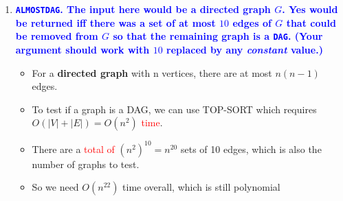 \documentclass[11pt]{article}
\begin{document}
\begin{enumerate}
\begin{enumerate}
    \item \textbf{\textcolor{blue}{{\tt ALMOSTDAG}. The input here would be a directed graph $G$. Yes would be returned iff there was a set of at most $10$ edges of $G$ that could be removed from $G$ so that the remaining graph is a {\tt DAG}. (Your argument should work with $10$ replaced by any {\em constant} value.)}}
        \begin{itemize}
            \item For a \textbf{directed graph} with n vertices, there are at most $n(n-1)$ edges.
            \item To test if a graph is a DAG, we can use TOP-SORT which requires $O(|V|+|E|) = O(n^2)$ \textcolor{red}{time}.
            \item There are a \textcolor{red}{total of} $(n^2)^{10} = n^{20}$ sets of 10 edges, which is also the number of graphs to test.
            \item So we need $O(n^{22})$ time overall, which is still polynomial
        \end{itemize}
\end{enumerate}
    

\end{enumerate}
\end{document}
